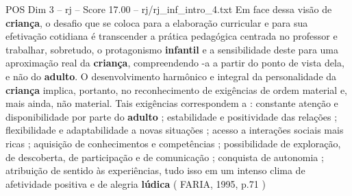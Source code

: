 \begin{textsample}{POS Dim 3 – rj – Score 17.00 – rj/rj\_inf\_intro\_4.txt}
Em face dessa visão de \textbf{criança}, o desafio que se coloca para a elaboração curricular e para sua efetivação cotidiana é transcender a prática pedagógica centrada no professor e trabalhar, sobretudo, o protagonismo \textbf{infantil} e a sensibilidade deste para uma aproximação real da \textbf{criança}, compreendendo -a a partir do ponto de vista dela, e não do \textbf{adulto}.
O desenvolvimento harmônico e integral da personalidade da \textbf{criança} implica, portanto, no reconhecimento de exigências de ordem material e, mais ainda, não material.
Tais exigências correspondem a : constante atenção e disponibilidade por parte do \textbf{adulto} ; estabilidade e positividade das relações ; flexibilidade e adaptabilidade a novas situações ; acesso a interações sociais mais ricas ; aquisição de conhecimentos e competências ; possibilidade de exploração, de descoberta, de participação e de comunicação ; conquista de autonomia ; atribuição de sentido às experiências, tudo isso em um intenso clima de afetividade positiva e de alegria \textbf{lúdica} ( FARIA, 1995, p.71 )

\end{textsample}
